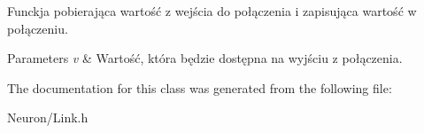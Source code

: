 \-Funckja pobierająca wartość z wejścia do połączenia i zapisująca wartość w połączeniu. 
\begin{DoxyParams}{\-Parameters}
{\em v} & \-Wartość, która będzie dostępna na wyjściu z połączenia. \\
\hline
\end{DoxyParams}


\-The documentation for this class was generated from the following file\-:\begin{DoxyCompactItemize}
\item 
\-Neuron/\-Link.\-h\end{DoxyCompactItemize}
